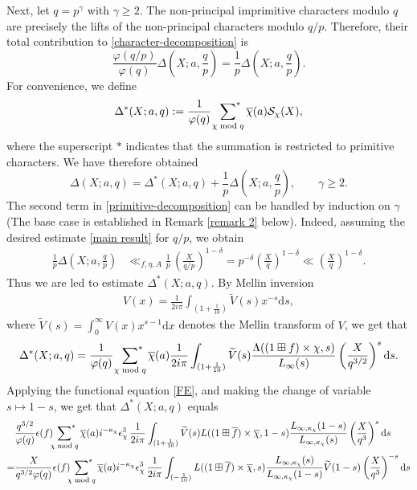 \documentclass[11pt,reqno]{amsart}
\newcommand{\bna}{\begin{eqnarray*}}
\newcommand{\ena}{\end{eqnarray*}}
\numberwithin{equation}{section}
\theoremstyle{plain}
\theoremstyle{definition}
\begin{document}
Next, let $q=p^\gamma$ with $\gamma\geq2$. The non-principal
imprimitive characters modulo $q$ are precisely the lifts of the
non-principal characters modulo $q/p$. Therefore, their total
contribution to \eqref{character-decomposition} is
\[
\frac{\varphi(q/p)}{\varphi(q)}
\Delta\left(X;a,\frac{q}{p}\right)
=
\frac{1}{p}\Delta\left(X;a,\frac{q}{p}\right).
\]
For convenience, we define
\[
\Delta^{\ast}(X;a,q):=\frac{1}{\varphi(q)}\,\,
\sideset{}{^\ast}\sum_{\chi\bmod q}
\overline{\chi}(a)\mathcal{S}_\chi(X),
\]
where the superscript $\ast$ indicates that the summation is
restricted to primitive characters.  We have therefore obtained
\begin{equation}\label{primitive-decomposition}
\Delta(X;a,q)=\Delta^{\ast}(X;a,q)+\frac{1}{p}\Delta\left(X;a,\frac{q}{p}\right),
\qquad \gamma\geq 2.
\end{equation}
The second term in \eqref{primitive-decomposition} can be handled
by induction on $\gamma$ (The base case is established in Remark \ref{remark 2} below). Indeed, assuming the desired estimate \eqref{main result} for
$q/p$, we obtain
\[
\begin{split}
\frac{1}{p}\Delta\left(X;a,\frac{q}{p}\right)
&\ll_{f,\eta,A}\frac{1}{p}\,\left(\frac{X}{q/p}\right)^{1-\delta}
=p^{-\delta}\left(\frac{X}{q}\right)^{1-\delta}
\ll\left(\frac{X}{q}\right)^{1-\delta}.
\end{split}
\]
Thus we are led to estimate $\Delta^{\ast}(X;a,q)$.
By Mellin inversion
\bna
V(x)=\frac{1}{2 i\pi}\int_{(1+\frac{1}{10})}\widetilde{V}(s)x^{-s}\mathrm{d}s,
\ena
where $\widetilde V(s)=\int_0^\infty V(x)x^{s-1}\mathrm{d}x$
denotes the Mellin transform of $V$, we get that 
\begin{equation*}
\begin{split}
\Delta^{\ast}(X;a,q)=\frac{1}{\varphi(q)}\,\,
\sideset{}{^\ast}\sum_{\chi\bmod  q}\overline{\chi}(a)
\frac{1}{2 i\pi}\int_{(1+\frac{1}{10})}\widetilde{V}(s)\frac{\Lambda((1\boxplus f)\times\chi,s)}
{L_\infty(s)}\left(\frac{X}{q^{3/2}}\right)^s\mathrm{d}s.
\end{split}\end{equation*}
Applying the functional equation \eqref{FE}, and making the change of variable
$s\mapsto 1-s$, we get that $\Delta^{\ast}(X;a,q)$ equals 
\begin{equation*}
\begin{split}
&\frac{q^{3/2}}{\varphi(q)}\epsilon(f)\sideset{}{^\ast}\sum_{\chi\bmod  q}
\overline{\chi}(a) i^{-\kappa_\chi}\epsilon_\chi^3\,\frac{1}{2 i\pi}\int_{(1+\frac{1}{10})}\widetilde{V}(s)
L((1\boxplus \overline{f})\times \overline{\chi},1-s)
\frac{L_{\infty,\kappa_\chi}(1-s)}
{L_{\infty,\kappa_\chi}(s)}\left(\frac{X}{q^3}\right)^s\mathrm{d}s\\
=&\frac{X}{q^{3/2}\varphi(q)}\epsilon(f)
\sideset{}{^\ast}\sum_{\chi\bmod  q}
\overline{\chi}(a) i^{-\kappa_\chi} \epsilon_\chi^3\,\frac{1}{2 i\pi}\int_{(-\frac{1}{10})}
L((1\boxplus \overline{f})\times \overline{\chi},s)
\frac{L_{\infty,\kappa_\chi}(s)}{L_{\infty,\kappa_\chi}(1-s)}\widetilde
V(1-s)\left(\frac{X}{q^3}\right)^{-s}\mathrm{d}s
\end{split}\end{equation*}
\end{document}
